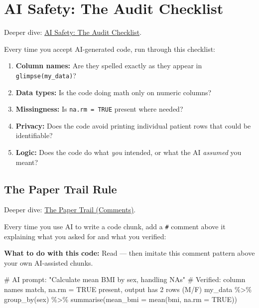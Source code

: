 \documentclass[
  letterpaper,
  DIV=11,
  numbers=noendperiod,
  oneside]{scrreprt}
\newenvironment{Shaded}{\begin{snugshade}}{\end{snugshade}}
\newcommand{\AttributeTok}[1]{\textcolor[rgb]{0.40,0.45,0.13}{#1}}
\newcommand{\CommentTok}[1]{\textcolor[rgb]{0.37,0.37,0.37}{#1}}
\newcommand{\ConstantTok}[1]{\textcolor[rgb]{0.56,0.35,0.01}{#1}}
\newcommand{\FunctionTok}[1]{\textcolor[rgb]{0.28,0.35,0.67}{#1}}
\newcommand{\NormalTok}[1]{\textcolor[rgb]{0.00,0.23,0.31}{#1}}
\newcommand{\SpecialCharTok}[1]{\textcolor[rgb]{0.37,0.37,0.37}{#1}}
\providecommand{\tightlist}{%
  \setlength{\itemsep}{0pt}\setlength{\parskip}{0pt}}
\begin{document}
\section*{AI Safety: The Audit
Checklist}\label{ai-safety-the-audit-checklist}


Deeper dive: \href{r07-ai-audit-checklist.qmd}{AI Safety: The Audit
Checklist}.

Every time you accept AI-generated code, run through this checklist:

\begin{enumerate}
\def\labelenumi{\arabic{enumi}.}
\tightlist
\item
  \textbf{Column names:} Are they spelled exactly as they appear in
  \texttt{glimpse(my\_data)}?
\item
  \textbf{Data types:} Is the code doing math only on numeric columns?
\item
  \textbf{Missingness:} Is \texttt{na.rm\ =\ TRUE} present where needed?
\item
  \textbf{Privacy:} Does the code avoid printing individual patient rows
  that could be identifiable?
\item
  \textbf{Logic:} Does the code do what \emph{you} intended, or what the
  AI \emph{assumed} you meant?
\end{enumerate}

\subsection*{The Paper Trail Rule}\label{the-paper-trail-rule}

Deeper dive: \href{r08-comments.qmd}{The Paper Trail (Comments)}.

Every time you use AI to write a code chunk, add a \texttt{\#} comment
above it explaining what you asked for and what you verified:

\textbf{What to do with this code:} Read --- then imitate this comment
pattern above your own AI-assisted chunks.

\begin{Shaded}
\begin{Highlighting}[numbers=left,,]
\CommentTok{\# AI prompt: "Calculate mean BMI by sex, handling NAs"}
\CommentTok{\# Verified: column names match, na.rm = TRUE present, output has 2 rows (M/F)}
\NormalTok{my\_data }\SpecialCharTok{\%\textgreater{}\%}
  \FunctionTok{group\_by}\NormalTok{(sex) }\SpecialCharTok{\%\textgreater{}\%}
  \FunctionTok{summarise}\NormalTok{(}\AttributeTok{mean\_bmi =} \FunctionTok{mean}\NormalTok{(bmi, }\AttributeTok{na.rm =} \ConstantTok{TRUE}\NormalTok{))}
\end{Highlighting}
\end{Shaded}
\end{document}
